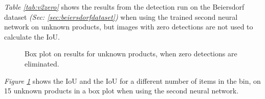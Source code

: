 \textit{Table \ref{tab:v2zero}} shows the results from the detection run on the Beiersdorf dataset \textit{(Sec: \ref{sec:beiersdorfdataset})} when using the trained second neural network on unknown products, but images with zero detections are not used to calculate the IoU. %

\begin{figure}[h]
 \centering
 \hfill
 
 \caption{Box plot on results for unknown products, when zero detections are eliminated.}
 \label{fig:v2zerofig}
\end{figure}

\textit{Figure \ref{fig:v2zerofig}} shows the IoU and the IoU for a different number of items in the bin, on 15 unknown products in a box plot when using the second neural network.


\clearpage
